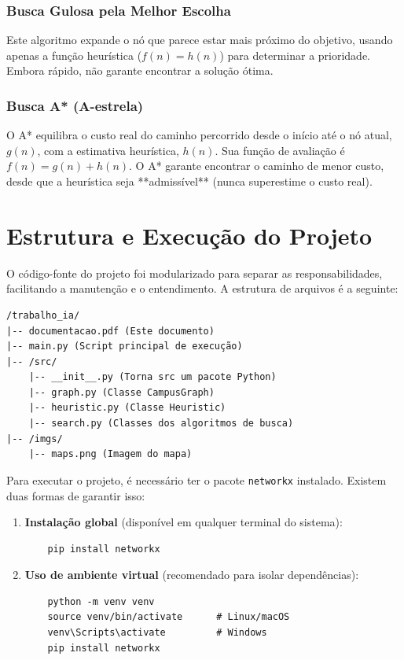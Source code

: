 \documentclass[12pt, a4paper]{article}
\begin{document}
\subsubsection{Busca Gulosa pela Melhor Escolha}
Este algoritmo expande o nó que parece estar mais próximo do objetivo, usando apenas a função heurística ($f(n) = h(n)$) para determinar a prioridade. Embora rápido, não garante encontrar a solução ótima.

\subsubsection{Busca A* (A-estrela)}
O A* equilibra o custo real do caminho percorrido desde o início até o nó atual, $g(n)$, com a estimativa heurística, $h(n)$. Sua função de avaliação é $f(n) = g(n) + h(n)$. O A* garante encontrar o caminho de menor custo, desde que a heurística seja **admissível** (nunca superestime o custo real).

\section{Estrutura e Execução do Projeto}
O código-fonte do projeto foi modularizado para separar as responsabilidades, facilitando a manutenção e o entendimento. A estrutura de arquivos é a seguinte:

\begin{verbatim}
/trabalho_ia/
|-- documentacao.pdf (Este documento)
|-- main.py (Script principal de execução)
|-- /src/
    |-- __init__.py (Torna src um pacote Python)
    |-- graph.py (Classe CampusGraph)
    |-- heuristic.py (Classe Heuristic)
    |-- search.py (Classes dos algoritmos de busca)
|-- /imgs/
    |-- maps.png (Imagem do mapa)
\end{verbatim}


Para executar o projeto, é necessário ter o pacote \texttt{networkx} instalado. Existem duas formas de garantir isso:

\begin{enumerate}
    \item \textbf{Instalação global} (disponível em qualquer terminal do sistema):
    \begin{verbatim}
    pip install networkx
    \end{verbatim}

    \item \textbf{Uso de ambiente virtual} (recomendado para isolar dependências):
    \begin{verbatim}
    python -m venv venv
    source venv/bin/activate      # Linux/macOS
    venv\Scripts\activate         # Windows
    pip install networkx
    \end{verbatim}
\end{enumerate}
\end{document}
